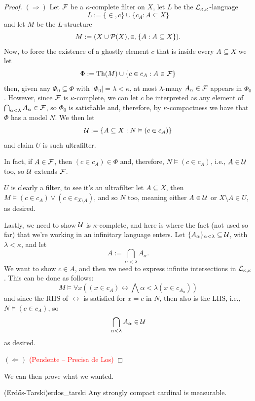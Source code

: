 \begin{proof}
    $(\Rightarrow)$ Let $\mathcal{F}$ be a $\kappa$-complete filter on $X$, let $L$ be the $\mathcal{L}_{\kappa,\kappa}$-language
    $$L:=\{\in,c\}\cup\{c_A:A\subseteq X\}$$
    and let $M$ be the $L$-structure
    $$M:=(X\cup\mathcal{P}(X),\in,\{A:A\subseteq X\}).$$
    Now, to force the existence of a ghostly element $c$ that is inside every $A\subseteq X$ we let
    $$\Phi:=\mathrm{Th}(M)\cup\{c\in c_A:A\in\mathcal{F}\}$$
    then, given any $\Phi_0\subseteq\Phi$ with $\lvert\Phi_0\rvert=\lambda<\kappa$, at most $\lambda$-many $A_\alpha\in\mathcal{F}$ appears in $\Phi_0$. However, since $\mathcal{F}$ is $\kappa$-complete, we can let $c$ be interpreted as any element of $\bigcap_{\alpha<\lambda}A_\alpha\in\mathcal{F}$, so $\Phi_0$ is satisfiable and, therefore, by $\kappa$-compactness we have that $\Phi$ has a model $N$. We then let
    $$\mathcal{U}:=\{A\subseteq X:N\vDash(c\in c_A)\}$$
    and claim $U$ is such ultrafilter.

    In fact, if $A\in\mathcal{F}$, then $(c\in c_A)\in\Phi$ and, therefore, $N\vDash(c\in c_A)$, i.e., $A\in \mathcal{U}$ too, so $\mathcal{U}$ extends $\mathcal{F}$.

    $U$ is clearly a filter, to see it's an ultrafilter let $A\subseteq X$, then $M\vDash(c\in c_A)\vee(c\in c_{X\setminus A})$, and so $N$ too, meaning either $A\in \mathcal{U}$ or $X\setminus A\in U$, as desired.

    Lastly, we need to show $\mathcal{U}$ is $\kappa$-complete, and here is where the fact (not used so far) that we're working in an infinitary language enters. Let $\{A_\alpha\}_{\alpha<\lambda}\subseteq \mathcal{U}$, with $\lambda<\kappa$, and let
    $$A:=\bigcap_{\alpha<\lambda}A_\alpha.$$
    We want to show $c\in A$, and then we need to express infinite intersections in $\mathcal{L}_{\kappa,\kappa}$. This can be done as follows:
    $$M\vDash\forall x\left((x\in c_A)\leftrightarrow\bigwedge{\alpha<\lambda}(x\in c_{A_\alpha})\right)$$
    and since the RHS of $\leftrightarrow$ is satisfied for $x=c$ in $N$, then also is the LHS, i.e., $N\vDash(c\in c_A)$, so
    $$\bigcap_{\alpha<\lambda}A_\alpha\in \mathcal{U}$$
    as desired.

    $(\Leftarrow)$ \textcolor{red}{(Pendente -- Precisa de Los)}
\end{proof}

We can then prove what we wanted.

\begin{corollary}{(Erdős-Tarski)}{erdos_tarski}
    Any strongly compact cardinal is measurable.
\end{corollary}

